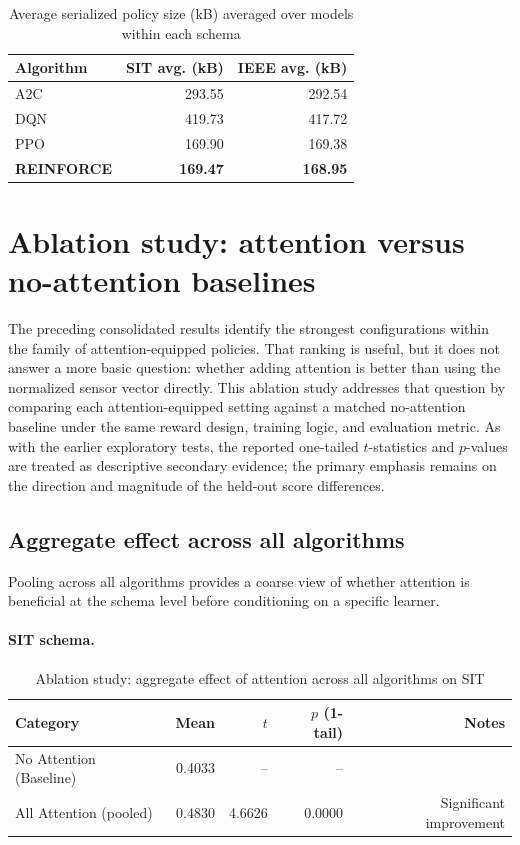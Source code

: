 \documentclass[12pt,oneside]{book}
\begin{document}
\begin{table}[htbp]
	\centering
	\caption{Average serialized policy size (kB) averaged over models within each schema}
	\label{tab:final-model-size}
	\begin{tabular}{l r r}
		\toprule
		\textbf{Algorithm} & \textbf{SIT avg. (kB)} & \textbf{IEEE avg. (kB)}\\
		\midrule
		A2C & 293.55 & 292.54 \\
		DQN & 419.73 & 417.72 \\
		PPO & 169.90 & 169.38 \\
		\textbf{REINFORCE} & \textbf{169.47} & \textbf{168.95} \\
		\bottomrule
	\end{tabular}
\end{table}

\section{Ablation study: attention versus no-attention baselines}\label{sec:results-ablation}

The preceding consolidated results identify the strongest configurations within the family of attention-equipped policies. That ranking is useful, but it does not answer a more basic question: whether adding attention is better than using the normalized sensor vector directly. This ablation study addresses that question by comparing each attention-equipped setting against a matched no-attention baseline under the same reward design, training logic, and evaluation metric. As with the earlier exploratory tests, the reported one-tailed $t$-statistics and $p$-values are treated as descriptive secondary evidence; the primary emphasis remains on the direction and magnitude of the held-out score differences.

\subsection{Aggregate effect across all algorithms}

Pooling across all algorithms provides a coarse view of whether attention is beneficial at the schema level before conditioning on a specific learner.

\paragraph{SIT schema.}

\begin{table}[htbp]
\centering
\caption{Ablation study: aggregate effect of attention across all algorithms on SIT}
\label{tab:ablation-all-sit}
\begin{tabular}{l r r r r}
\toprule
\textbf{Category} & \textbf{Mean} & \textbf{$t$} & \textbf{$p$ (1-tail)} & \textbf{Notes}\\
\midrule
No Attention (Baseline) & 0.4033 & -- & -- & \\
All Attention (pooled) & 0.4830 & 4.6626 & 0.0000 & Significant improvement\\
\bottomrule
\end{tabular}
\end{table}
\end{document}
